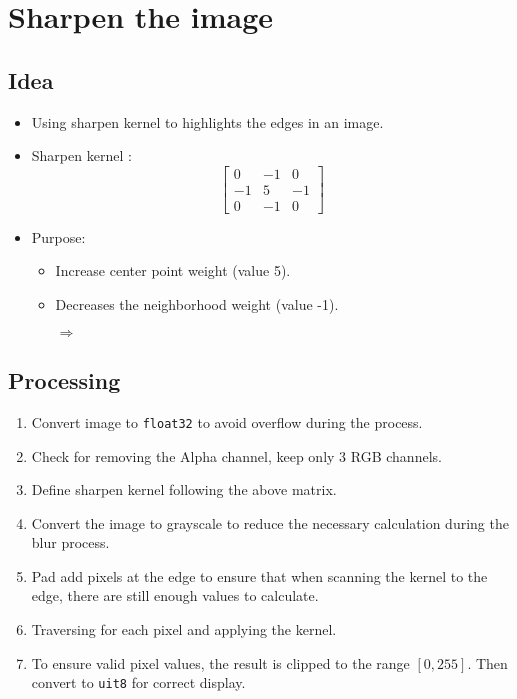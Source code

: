 \chapter{Sharpen the image}

\section{Idea}
\begin{itemize}
    \item Using sharpen kernel to highlights the edges in an image.
    \item Sharpen kernel \cite{box_blur}:
    \[
        \begin{bmatrix}
            0 & -1 & 0 \\
            -1 & 5 & -1 \\
            0 & -1 & 0
        \end{bmatrix}
    \]
    \item Purpose:
    \begin{itemize}
        \item Increase center point weight (value 5).
        \item Decreases the neighborhood weight (value -1).
        \begin{flushleft}
            $\Rightarrow$ 
        \end{flushleft}
    \end{itemize}
\end{itemize}

\section{Processing}
\begin{enumerate}
    \item Convert image to \texttt{float32} to avoid overflow during the process.
    \item Check for removing the Alpha channel, keep only 3 RGB channels.
    \item Define sharpen kernel following the above matrix.
    \item Convert the image to grayscale to reduce the necessary calculation during the blur process.
    \item Pad add pixels at the edge to ensure that when scanning the kernel to the edge, there are still enough values to calculate.
    \item Traversing for each pixel and applying the kernel.
    \item To ensure valid pixel values, the result is clipped to the range \([0, 255]\). Then convert to \texttt{uit8} for correct display.
\end{enumerate}

